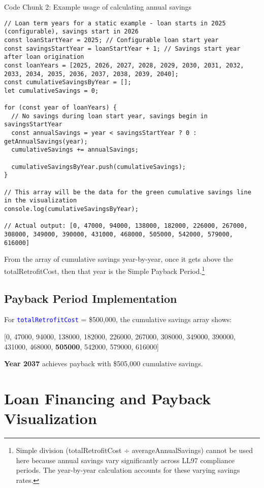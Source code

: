 \documentclass{article}
\newcommand{\code}[1]{\textcolor{blue}{\texttt{#1}}}
\begin{document}
Code Chunk 2: Example usage of calculating annual savings
\begin{lstlisting}
// Loan term years for a static example - loan starts in 2025 (configurable), savings start in 2026
const loanStartYear = 2025; // Configurable loan start year
const savingsStartYear = loanStartYear + 1; // Savings start year after loan origination
const loanYears = [2025, 2026, 2027, 2028, 2029, 2030, 2031, 2032, 2033, 2034, 2035, 2036, 2037, 2038, 2039, 2040];
const cumulativeSavingsByYear = [];
let cumulativeSavings = 0;

for (const year of loanYears) {
  // No savings during loan start year, savings begin in savingsStartYear
  const annualSavings = year < savingsStartYear ? 0 : getAnnualSavings(year);
  cumulativeSavings += annualSavings;
  
  cumulativeSavingsByYear.push(cumulativeSavings);
}

// This array will be the data for the green cumulative savings line in the visualization
console.log(cumulativeSavingsByYear);

// Actual output: [0, 47000, 94000, 138000, 182000, 226000, 267000, 308000, 349000, 390000, 431000, 468000, 505000, 542000, 579000, 616000]
\end{lstlisting}

From the array of cumulative savings year-by-year, once it gets above the totalRetrofitCost, then that year is the Simple Payback Period.\footnote{Simple division (totalRetrofitCost ÷ averageAnnualSavings) cannot be used here because annual savings vary significantly across LL97 compliance periods. The year-by-year calculation accounts for these varying savings rates.}

\subsection{Payback Period Implementation}

For \code{totalRetrofitCost} = \$500,000, the cumulative savings array shows:

[0, 47000, 94000, 138000, 182000, 226000, 267000, 308000, 349000, 390000, 431000, 468000, \textbf{505000}, 542000, 579000, 616000]

\textbf{Year 2037} achieves payback with \$505,000 cumulative savings.

\section{Loan Financing and Payback Visualization}
\end{document}
